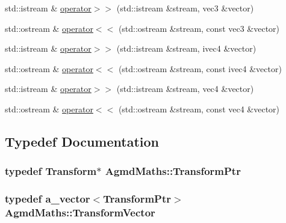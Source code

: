 \begin{DoxyCompactItemize}
std\+::istream \& \hyperlink{namespace_agmd_maths_a52281ec0a32881931cd568998fc1db73}{operator$>$$>$} (std\+::istream \&stream, vec3 \&vector)
\item 
std\+::ostream \& \hyperlink{namespace_agmd_maths_ad46d395979bf0a43ba4d33a81be85b67}{operator$<$$<$} (std\+::ostream \&stream, const vec3 \&vector)
\item 
std\+::istream \& \hyperlink{namespace_agmd_maths_a423f1349a12a68bd176eafd8fbbce61f}{operator$>$$>$} (std\+::istream \&stream, ivec4 \&vector)
\item 
std\+::ostream \& \hyperlink{namespace_agmd_maths_abbf71477c0d239bf696577fab9fd3818}{operator$<$$<$} (std\+::ostream \&stream, const ivec4 \&vector)
\item 
std\+::istream \& \hyperlink{namespace_agmd_maths_a69bf40a901f5372f802dfc3486d50dba}{operator$>$$>$} (std\+::istream \&stream, vec4 \&vector)
\item 
std\+::ostream \& \hyperlink{namespace_agmd_maths_a3604cdb12a66343c1f4f9497cd917917}{operator$<$$<$} (std\+::ostream \&stream, const vec4 \&vector)
\end{DoxyCompactItemize}


\subsection{Typedef Documentation}
\hypertarget{namespace_agmd_maths_a5f0367fe1d910e5b7bf2f4b657f33aff}{
\subsubsection[{Transform\+Ptr}]{\setlength{\rightskip}{0pt plus 5cm}typedef {\bf Transform}$\ast$ {\bf Agmd\+Maths\+::\+Transform\+Ptr}}}\label{namespace_agmd_maths_a5f0367fe1d910e5b7bf2f4b657f33aff}
\hypertarget{namespace_agmd_maths_a4574846b921ff329a31770fd826ba896}{
\subsubsection[{Transform\+Vector}]{\setlength{\rightskip}{0pt plus 5cm}typedef {\bf a\+\_\+vector}$<${\bf Transform\+Ptr}$>$ {\bf Agmd\+Maths\+::\+Transform\+Vector}}}\label{namespace_agmd_maths_a4574846b921ff329a31770fd826ba896}


